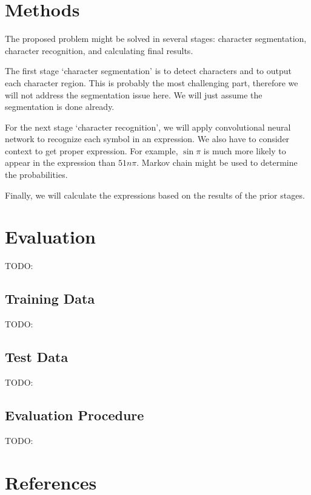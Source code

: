 \documentclass[10pt,twocolumn,letterpaper]{article}
\begin{document}
\section{Methods}

The proposed problem might be solved in several stages:
character segmentation, character recognition, and calculating final results.

The first stage `character segmentation' is to detect characters and to output each character region.
This is probably the most challenging part, therefore we will not address the segmentation issue here.
We will just assume the segmentation is done already. 

For the next stage `character recognition',
we will apply convolutional neural network to recognize each symbol in an expression.
We also have to consider context to get proper expression. For example, $\sin \pi$ is much more likely to appear in the expression than $51n \pi$. Markov chain might be used to determine the probabilities.

Finally, we will calculate the expressions based on the results of the prior stages.

\section{Evaluation}

TODO:

\subsection{Training Data}

TODO:

\subsection{Test Data}

TODO:

\subsection{Evaluation Procedure}
TODO:

\section{References}

{\small


}
\end{document}

